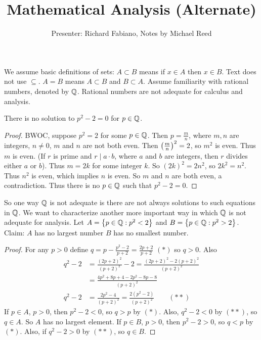 \documentclass[]{article}
\author{Presenter: Richard Fabiano, Notes by Michael Reed}
\title{Mathematical Analysis (Alternate)}
\begin{document}
\maketitle


We assume basic definitions of sets:
$A\subset B$ means if $x\in A$ then $x\in B$.
Text does not use $\subseteq$.
$A = B$ means $A\subset B$ and $B\subset A$.
Assume familiarity with rational numbers, denoted by $\mathbb{Q}$.
Rational numbers are not adequate for calculus and analysis.

\begin{example}
	There is no solution to $p^2-2=0$ for $p\in\mathbb{Q}$.
\end{example}
\begin{proof}
	BWOC, suppose $p^2=2$ for some $p\in\mathbb{Q}$. Then $p = \frac mn$, where $m,n$ are integers, $n\neq0$, $m$ and $n$ are not both even.
	Then $\left(\frac mn\right)^2=2$, so $m^2$ is even. Thus $m$ is even. (If $r$ is prime and $r\mid a\cdot b$, where $a$ and $b$ are integers, then $r$ divides either $a$ or $b$).
	Thus $m = 2k$ for some integer $k$. So $(2k)^2=2n^2$, so $2k^2=n^2$.
	Thus $n^2$ is even, which implies $n$ is even.
	So $m$ and $n$ are both even, a contradiction.
	Thus there is no $p\in\mathbb{Q}$ such that $p^2-2=0$.
\end{proof}

So one way $\mathbb{Q}$ is not adequate is there are not always solutions to such equations in $\mathbb{Q}$.
We want to characterize another more important way in which $\mathbb{Q}$ is not adequate for analysis.
Let $ A = \left\{ p\in\mathbb{Q} : p^2<2 \right\} $ and $B=\left\{ p\in\mathbb{Q} : p^2>2 \right\}$.
Claim: $A$ has no largest number $B$ has no smallest number.

\begin{proof}
	For any $p>0$ define $q = p-\frac{p^2-2}{p+2} = \frac{2p+2}{p+2}$ $(*)$ so $q>0$.
	Also
	\begin{align*}
		q^2-2 &= \frac{(2p+2)^2}{(p+2)^2} - 2 = \frac{(2p+2)^2-2(p+2)^2}{(p+2)^2} \\
			  &= \frac{4p^2+8p+4-2p^2-8p-8}{(p+2)^2} \\
		q^2-2 &= \frac{2p^2-4}{(p+2)^2} = \frac{2(p^2-2)}{(p+2)^2} \qquad (**)
	\end{align*}
	If $p\in A$, $p>0$, then $p^2-2<0$, so $q>p$ by $(*)$.
	Also, $q^2-2<0$ by $(**)$, so $q\in A$.
	So $A$ has no largest element. If $p\in B$, $p>0$, then $p^2-2>0$, so $q<p$ by $(*)$.
	Also, if $q^2-2>0$ by $(**)$, so $q\in B$.
\end{proof}
\end{document}
